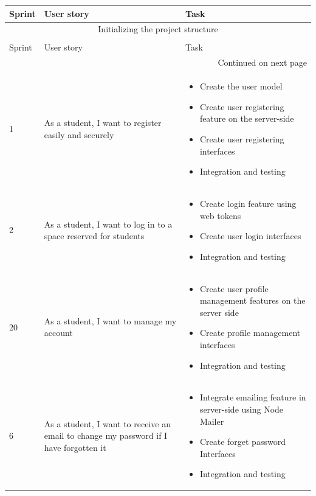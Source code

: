 \begin{longtable}{|l|p{6cm}|p{8cm}|}
\hline
Sprint & User story & Task\\
\hline
\multicolumn{3}{|c|}{Initializing the project structure} \\
\hline
\endfirsthead

\multicolumn{3}{c}{{\bfseries}} \\
\hline
Sprint & User story & Task\\
\hline
\endhead

\hline \multicolumn{3}{|r|}{{Continued on next page}} \\ \hline
\endfoot

\hline
\endlastfoot

1 & As a student, I want to register easily and securely & \begin{itemize}
    \item Create the user model
    \item Create user registering feature on the server-side
    \item Create user registering interfaces
    \item Integration and testing
\end{itemize} \\ \hline

2 & As a student, I want to log in to a space reserved for students & \begin{itemize}
    \item Create login feature using web tokens
    \item Create user login interfaces
    \item Integration and testing
\end{itemize} \\ \hline

20 & As a student, I want to manage my account & \begin{itemize}
    \item Create user profile management features on the server side
    \item Create profile management interfaces
    \item Integration and testing
\end{itemize} \\ \hline

6 & As a student, I want to receive an email to change my password if I have forgotten it & \begin{itemize}
    \item Integrate emailing feature in server-side using Node Mailer
    \item Create forget password Interfaces
    \item Integration and testing
\end{itemize} \\ \hline


\end{longtable}
